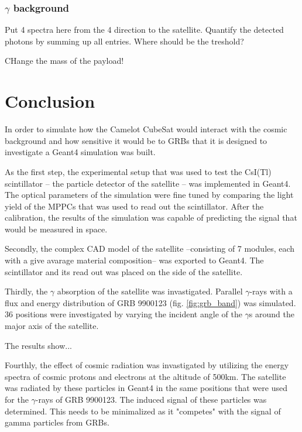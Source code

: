 \documentclass[12pt, a4paper,titlepage]{article}
\numberwithin{equation}{section}
\numberwithin{figure}{section}
\begin{document}
\subsubsection{$\gamma$ background}

\pagebreak

Put 4 spectra here from the 4 direction to the satellite. Quantify the detected photons by summing up all entries. Where should be the treshold?

CHange the mass of the payload!

\pagebreak

\section{Conclusion}

In order to simulate how the Camelot CubeSat would interact with the cosmic background and how sensitive it would be to GRBs that it is designed to investigate a Geant4 simulation was built.

As the first step, the experimental setup that was used to test the CsI(Tl) scintillator -- the particle detector of the satellite -- was implemented in Geant4. The optical parameters of the simulation were fine tuned by comparing the light yield of the MPPCs that was used to read out the scintillator. After the calibration, the results of the simulation was capable of predicting the signal that would be measured in space.

Secondly, the complex CAD model of the satellite --consisting of 7 modules, each with a give avarage material composition-- was exported to Geant4. The scintillator and its read out was placed on the side of the satellite.

Thirdly, the $\gamma$ absorption of the satellite was invastigated. Parallel $\gamma$-rays with a flux and energy distribution of GRB 9900123 (fig. \ref{fig:grb_band}) was simulated. 36 positions were investigated by varying the incident angle of the $\gamma$s around the major axis of the satellite.

The results show...


Fourthly, the effect of cosmic radiation was invastigated by utilizing the energy spectra of cosmic protons and electrons at the altitude of 500km. The satellite was radiated by these particles in Geant4 in the same positions that were used for the $\gamma$-rays of GRB 9900123. The induced signal of these particles was determined. This needs to be minimalized as it "competes" with the signal of gamma particles from GRBs.
\end{document}
